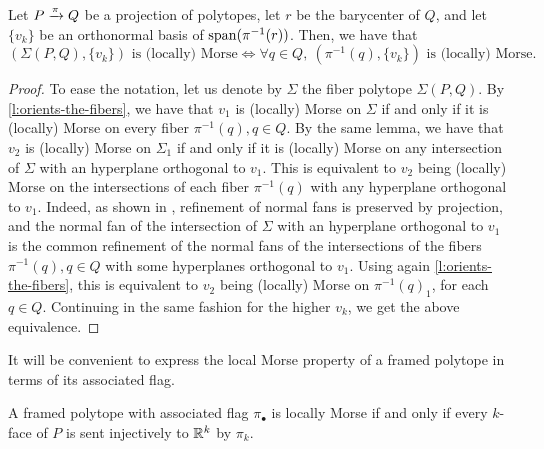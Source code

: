 
\begin{theorem}
\label{t:bot-top-for-fibers}
	Let $P \xrightarrow{\pi} Q$ be a projection of polytopes, let $r$ be the barycenter of $Q$, and let $\{v_k\}$ be an orthonormal basis of $\operatorname{\mathrm{span}}(\pi^{-1}(r))$.
	Then, we have that
	\[
	(\Sigma(P,Q),\{v_k\}) \text{ is (locally) Morse}
	\iff
	\forall q \in Q, \ (\pi^{-1}(q),\{v_k\}) \text{ is (locally) Morse}.
	\]
\end{theorem}

\begin{proof}
	To ease the notation, let us denote by $\Sigma$ the fiber polytope $\Sigma(P,Q)$.
	By \cref{l:orients-the-fibers}, we have that $v_1$ is (locally) Morse on $\Sigma$ if and only if it is (locally) Morse on every fiber $\pi^{-1}(q), q \in Q$.
	By the same lemma, we have that $v_2$ is (locally) Morse on $\Sigma_1$ if and only if it is (locally) Morse on any intersection of $\Sigma$ with an hyperplane orthogonal to $v_1$.
	This is equivalent to $v_2$ being (locally) Morse on the intersections of each fiber $\pi^{-1}(q)$ with any hyperplane orthogonal to $v_1$.
	Indeed, as shown in \cite[Lemma 3.1]{BilleraSturmfels94}, refinement of normal fans is preserved by projection, and the normal fan of the intersection of $\Sigma$ with an hyperplane orthogonal to $v_1$ is the common refinement of the normal fans of the intersections of the fibers $\pi^{-1}(q), q \in Q$ with some hyperplanes orthogonal to $v_1$.
	Using again \cref{l:orients-the-fibers}, this is equivalent to $v_2$ being (locally) Morse on $\pi^{-1}(q)_1$, for each $q \in Q$.
	Continuing in the same fashion for the higher $v_k$, we get the above equivalence.
\end{proof}

It will be convenient to express the local Morse property of a framed polytope in terms of its associated flag.

\begin{theorem}
	A framed polytope with associated flag $\pi_\bullet$ is locally Morse if and only if every $k$-face of $P$ is sent injectively to $\mathbb{R}^k$ by $\pi_k$.
\end{theorem}


